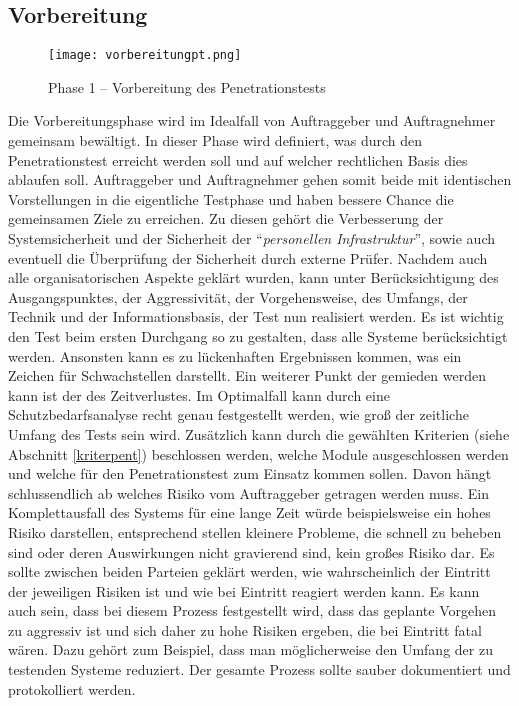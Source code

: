 \subsection{Vorbereitung}

\begin{figure}[h]
	\centering
	\texttt{[image: vorbereitungpt.png]}
	\caption{Phase 1 – Vorbereitung des Penetrationstests}
\end{figure}

Die Vorbereitungsphase wird im Idealfall von Auftraggeber und Auftragnehmer gemeinsam bewältigt. In dieser Phase wird definiert, was durch den Penetrationstest erreicht werden soll und auf welcher rechtlichen Basis dies ablaufen soll. Auftraggeber und Auftragnehmer gehen somit beide mit identischen Vorstellungen in die eigentliche Testphase und haben bessere Chance die gemeinsamen Ziele zu erreichen. Zu diesen gehört die Verbesserung der Systemsicherheit und der Sicherheit der "`\textit{personellen Infrastruktur}"', sowie auch eventuell die Überprüfung der Sicherheit durch externe Prüfer. Nachdem auch alle organisatorischen Aspekte geklärt wurden, kann unter Berücksichtigung des Ausgangspunktes, der Aggressivität, der Vorgehensweise, des Umfangs, der Technik und der Informationsbasis, der Test nun realisiert werden.
Es ist wichtig den Test beim ersten Durchgang so zu gestalten, dass alle Systeme berücksichtigt werden. Ansonsten kann es zu lückenhaften Ergebnissen kommen, was ein Zeichen für Schwachstellen darstellt. Ein weiterer Punkt der gemieden werden kann ist der des Zeitverlustes. Im Optimalfall kann durch eine Schutzbedarfsanalyse recht genau festgestellt werden, wie groß der zeitliche Umfang des Tests sein wird. Zusätzlich kann durch die gewählten Kriterien (siehe Abschnitt \ref{kriterpent}) beschlossen werden, welche Module ausgeschlossen werden und welche für den Penetrationstest zum Einsatz kommen sollen. Davon hängt schlussendlich ab welches Risiko vom Auftraggeber getragen werden muss. Ein Komplettausfall des Systems für eine lange Zeit würde beispielsweise ein hohes Risiko darstellen, entsprechend stellen kleinere Probleme, die schnell zu beheben sind oder deren Auswirkungen nicht gravierend sind, kein großes Risiko dar. Es sollte zwischen beiden Parteien geklärt werden, wie wahrscheinlich der Eintritt der jeweiligen Risiken ist und wie bei Eintritt reagiert werden kann. Es kann auch sein, dass bei diesem Prozess festgestellt wird, dass das geplante Vorgehen zu aggressiv ist und sich daher zu hohe Risiken ergeben, die bei Eintritt fatal wären. Dazu gehört zum Beispiel, dass man möglicherweise den Umfang der zu testenden Systeme reduziert.
Der gesamte Prozess sollte sauber dokumentiert und protokolliert werden\cite[100--102]{pt03bsi}.

